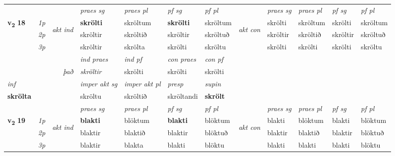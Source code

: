 \begin{longtable}[l]{X>{\footnotesize\itshape}llXXXXlXXXX}
\midrule

 & &   & \textit{praes sg}  & \textit{praes pl}    & \textit{ pf sg} & \textit{pf pl} & & \textit{praes sg}  & \textit{praes pl}    & \textit{pf sg} & \textit{pf pl }  \\ \cmidrule{4-7} \cmidrule{9-12}
 \multirow{2}{*}{{{\textbf{v{\textsubscript{2}}} \Large{\textbf{18}}}}}  & 1p & \multirow{3}{*}{\begin{turn}{90}\textit{akt ind}\end{turn}} & \textbf{skrölti} & skröltum & \textbf{skrölti} & skröltum & \multirow{3}{*}{\begin{turn}{90}\textit{akt con}\end{turn}} &skrölti & skröltum & skrölti & skröltum\\*
 & 2p &  &  skröltir  & skröltið & skröltir & skröltuð & & skröltir & skröltið & skröltir & skröltuð \\*
 & 3p &  & skröltir & skrölta & skrölti & skröltu & & skrölti & skrölti& skrölti & skröltu \\*
\cmidrule{4-7} \cmidrule{9-12}

   && &  \textit{ind praes} & \textit{ind pf} & \textit{con praes} & \textit{con pf} \\*
\multicolumn{3}{r}{\textit{það}} & skröltir & skrölti & skrölti & skrölti \\*

\cmidrule{4-7}
   {\textit{inf}} & &  & \textit{imper akt sg} & \textit{imper akt pl}   & \textit{presp} & \textit{supin}   \\*
  {\textbf{skrölta}} & && skröltu  & skröltið   & skröltandi &  \textbf{skrölt}   \\*

\midrule

 & &   & \textit{praes sg}  & \textit{praes pl}    & \textit{ pf sg} & \textit{pf pl} & & \textit{praes sg}  & \textit{praes pl}    & \textit{pf sg} & \textit{pf pl }  \\ \cmidrule{4-7} \cmidrule{9-12}
 \multirow{2}{*}{{{\textbf{v{\textsubscript{2}}} \Large{\textbf{19}}}}}  & 1p & \multirow{3}{*}{\begin{turn}{90}\textit{akt ind}\end{turn}} & \textbf{blakti} & blöktum & \textbf{blakti} & blöktum & \multirow{3}{*}{\begin{turn}{90}\textit{akt con}\end{turn}} &blakti & blöktum & blakti & blöktum\\*
 & 2p &  &  blaktir  & blaktið & blaktir & blöktuð & & blaktir & blaktið & blaktir & blöktuð \\*
 & 3p &  & blaktir & blakta & blakti & blöktu & & blakti & blakti& blakti & blöktu \\*
\cmidrule{4-7} \cmidrule{9-12}


\end{longtable}
